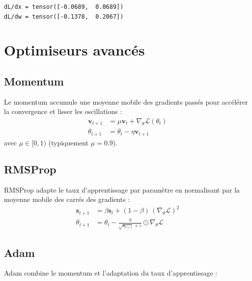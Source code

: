 \begin{codeoutput}
\begin{verbatim}
dL/dx = tensor([-0.0689,  0.0689])
dL/dw = tensor([-0.1378,  0.2067])
\end{verbatim}
\end{codeoutput}

\section{Optimiseurs avanc\'es}
\label{sec:optimiseurs}

\subsection{Momentum}

Le momentum accumule une moyenne mobile des gradients pass\'es pour acc\'el\'erer la convergence et lisser les oscillations :
\begin{align*}
\bm{v}_{t+1} &= \mu \bm{v}_t + \nabla_\theta \mathcal{L}(\theta_t) \\
\theta_{t+1} &= \theta_t - \eta \bm{v}_{t+1}
\end{align*}
avec $\mu \in [0,1)$ (typiquement $\mu = 0.9$).

\subsection{RMSProp}

RMSProp adapte le taux d'apprentissage par param\`etre en normalisant par la moyenne mobile des carr\'es des gradients :
\begin{align*}
\bm{s}_{t+1} &= \beta \bm{s}_t + (1-\beta)\,(\nabla_\theta \mathcal{L})^2 \\
\theta_{t+1} &= \theta_t - \frac{\eta}{\sqrt{\bm{s}_{t+1}} + \varepsilon} \odot \nabla_\theta \mathcal{L}
\end{align*}

\subsection{Adam}

Adam\cite{kingmaadam} combine le momentum et l'adaptation du taux d'apprentissage :

